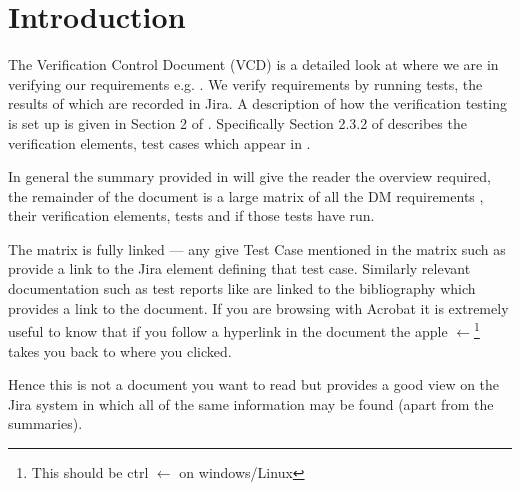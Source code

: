 
\section{Introduction}
\label{sec:intro}

The Verification Control Document (VCD) is a detailed look at where we are in verifying our requirements e.g. .
We verify requirements by
running tests, the results of which are recorded in Jira.  A description of how the verification testing is set up is given in Section 2 of .
Specifically Section 2.3.2 of  describes the verification elements, test cases which appear in .

In general the summary provided in  will give the reader the overview required, the remainder of the document is a large matrix of all the DM requirements , their verification elements, tests and if those tests have run.

The matrix is fully linked --- any give Test Case mentioned in the matrix such as  provide a link to the Jira element defining that test case. Similarly relevant documentation such as test reports like  are linked to the bibliography which provides a link to the document.
If you are browsing with Acrobat it is extremely useful to know that if you follow a hyperlink in the document the  apple $\leftarrow$\footnote{This should be ctrl $\leftarrow$ on windows/Linux} takes you back to where you clicked.

Hence this is not a document you want to read but provides a good view on the Jira system in which all of the same information may be found (apart from the summaries).
